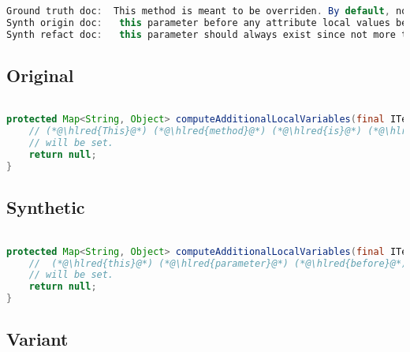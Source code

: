 \documentclass[11pt]{article}
\DeclareRobustCommand{\hlred}[1]{{\sethlcolor{YellowOrange}\hl{#1}}}
\begin{document}
  \begin{lstlisting}[language=java]
Ground truth doc:  This method is meant to be overriden. By default, no local variables
Synth origin doc:   this parameter before any attribute local values before tag parsing is executed is not
Synth refact doc:   this parameter should always exist since not more than this variable is expected to
  \end{lstlisting}

  \subsection{Original}
  \begin{lstlisting}[language=java]

protected Map<String, Object> computeAdditionalLocalVariables(final ITemplateContext context, final IProcessableElementTag tag, final AttributeName attributeName, final String attributeValue, final IStandardExpression expression) {
    // (*@\hlred{This}@*) (*@\hlred{method}@*) (*@\hlred{is}@*) (*@\hlred{meant}@*) (*@\hlred{to}@*) (*@\hlred{be}@*) (*@\hlred{overriden.}@*) (*@\hlred{By}@*) (*@\hlred{default,}@*) (*@\hlred{no}@*) (*@\hlred{local}@*) (*@\hlred{variables}@*)
    // will be set.
    return null;
}
  \end{lstlisting}
  \subsection{Synthetic}

  \begin{lstlisting}[language=java]

protected Map<String, Object> computeAdditionalLocalVariables(final ITemplateContext context, final IProcessableElementTag tag, final AttributeName attributeName, final String attributeValue, final IStandardExpression expression) {
    //  (*@\hlred{this}@*) (*@\hlred{parameter}@*) (*@\hlred{before}@*) (*@\hlred{any}@*) (*@\hlred{attribute}@*) (*@\hlred{local}@*) (*@\hlred{values}@*) (*@\hlred{before}@*) (*@\hlred{tag}@*) (*@\hlred{parsing}@*) (*@\hlred{is}@*) (*@\hlred{executed is not}@*)
    // will be set.
    return null;
}
  \end{lstlisting}

  \subsection{Variant}
\end{document}
